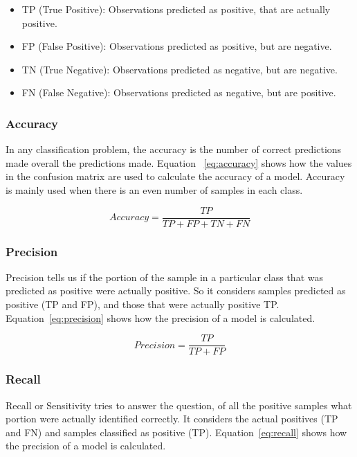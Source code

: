 \documentclass[12pt, a4paper,oneside]{report}
\begin{document}
\begin{itemize}
	\item TP (True Positive): Observations predicted as positive, that are actually positive.
	\item FP (False Positive): Observations predicted as positive, but are negative.
	\item TN (True Negative): Observations predicted as negative, but are negative.
	\item FN (False Negative): Observations predicted as negative, but are positive.
\end{itemize}

\subsubsection{Accuracy}
In any classification problem, the accuracy is the number of correct predictions made overall the predictions made. Equation ~\ref{eq:accuracy} shows how the values in the confusion matrix are used to calculate the accuracy of a model. Accuracy is mainly used when there is an even number of samples in each class.

\begin{equation}
Accuracy = \frac{TP}{TP + FP + TN + FN} \label{eq:accuracy}
\end{equation}


\subsubsection{Precision}
Precision tells us if the portion of the sample in a particular class that was predicted as positive were actually positive. So it considers samples predicted as positive (TP and FP), and those that were actually positive TP. Equation~\ref{eq:precision} shows how the precision of a model is calculated.

\begin{equation}
Precision = \frac{TP}{TP + FP} \label{eq:precision}
\end{equation}

\subsubsection{Recall}
Recall or Sensitivity tries to answer the question, of all the positive samples what portion were actually identified correctly.
It considers the actual positives (TP and FN) and samples classified as positive (TP).
Equation~\ref{eq:recall} shows how the precision of a model is calculated.
\end{document}
